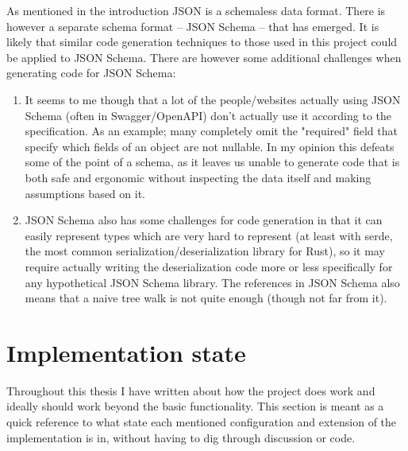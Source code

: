 As mentioned in the introduction JSON is a schemaless data format. There is however a separate schema format -- JSON Schema -- that has emerged. It is likely that similar code generation techniques to those used in this project could be applied to JSON Schema. There are however some additional challenges when generating code for JSON Schema:

\begin{enumerate}
  \item It seems to me though that a lot of the people/websites actually using JSON Schema (often in Swagger/OpenAPI) don't actually use it according to the specification. As an example; many completely omit the "required" field that specify which fields of an object are not nullable. In my opinion this defeats some of the point of a schema, as it leaves us unable to generate code that is both safe and ergonomic without inspecting the data itself and making assumptions based on it.
  \item JSON Schema also has some challenges for code generation in that it can easily represent types which are very hard to represent (at least with serde, the most common serialization/deserialization library for Rust), so it may require actually writing the deserialization code more or less specifically for any hypothetical JSON Schema library. The references in JSON Schema also means that a naive tree walk is not quite enough (though not far from it).
\end{enumerate}



\newpage
\section{Implementation state}
\label{sec:implementation-state}

Throughout this thesis I have written about how the project does work and ideally should work beyond the basic functionality. This section is meant as a quick reference to what state each mentioned configuration and extension of the implementation is in, without having to dig through discussion or code.


